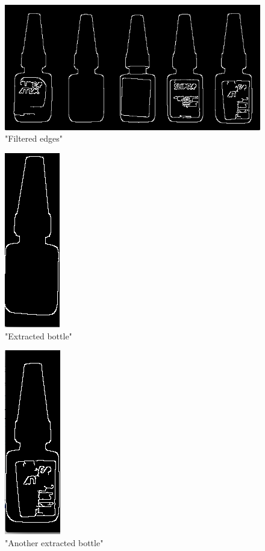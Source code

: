 \documentclass[12pt]{article}
\begin{document}
	\begin{figure}[H]
		\centering
		\includegraphics[width=15cm]{3}
		\caption{"Filtered edges"}
	\end{figure}
	
	\begin{figure}[H]
		\centering
		\includegraphics{4}
		\caption{"Extracted bottle"}
	\end{figure}
	
	\begin{figure}[H]
		\centering
		\includegraphics{5}
		\caption{"Another extracted bottle"}
	\end{figure}
	
\end{document}
